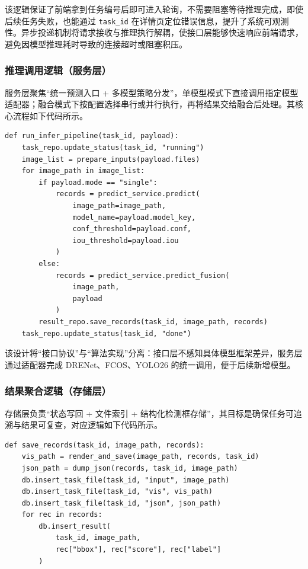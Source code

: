 该逻辑保证了前端拿到任务编号后即可进入轮询，不需要阻塞等待推理完成，即使后续任务失败，也能通过 \texttt{task\_id} 在详情页定位错误信息，提升了系统可观测性。异步投递机制将请求接收与推理执行解耦，使接口层能够快速响应前端请求，避免因模型推理耗时导致的连接超时或阻塞积压。

\subsubsection{推理调用逻辑（服务层）}

服务层聚焦“统一预测入口 + 多模型策略分发”，单模型模式下直接调用指定模型适配器；融合模式下按配置选择串行或并行执行，再将结果交给融合后处理。其核心流程如下代码所示。

\begin{verbatim}
def run_infer_pipeline(task_id, payload):
    task_repo.update_status(task_id, "running")
    image_list = prepare_inputs(payload.files)
    for image_path in image_list:
        if payload.mode == "single":
            records = predict_service.predict(
                image_path=image_path,
                model_name=payload.model_key,
                conf_threshold=payload.conf,
                iou_threshold=payload.iou
            )
        else:
            records = predict_service.predict_fusion(
                image_path,
                payload
            )
        result_repo.save_records(task_id, image_path, records)
    task_repo.update_status(task_id, "done")
\end{verbatim}

该设计将“接口协议”与“算法实现”分离：接口层不感知具体模型框架差异，服务层通过适配器完成 DRENet、FCOS、YOLO26 的统一调用，便于后续新增模型。

\subsubsection{结果聚合逻辑（存储层）}

存储层负责“状态写回 + 文件索引 + 结构化检测框存储”，其目标是确保任务可追溯与结果可复查，对应逻辑如下代码所示。

\begin{verbatim}
def save_records(task_id, image_path, records):
    vis_path = render_and_save(image_path, records, task_id)
    json_path = dump_json(records, task_id, image_path)
    db.insert_task_file(task_id, "input", image_path)
    db.insert_task_file(task_id, "vis", vis_path)
    db.insert_task_file(task_id, "json", json_path)
    for rec in records:
        db.insert_result(
            task_id, image_path,
            rec["bbox"], rec["score"], rec["label"]
        )
\end{verbatim}

